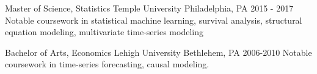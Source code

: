 
\begin{cventries}

\cventry
{Master of Science, Statistics}
{Temple University}
{Philadelphia, PA}
	{2015 - 2017}
{Notable coursework in statistical machine learning, survival analysis, structural equation modeling, multivariate time-series modeling}
\end{cventries}


\begin{cventries}
\cventry
{Bachelor of Arts, Economics}
{Lehigh University}
{Bethlehem, PA}
	{2006-2010}
{Notable coursework in time-series forecasting, causal modeling.}
\end{cventries}
